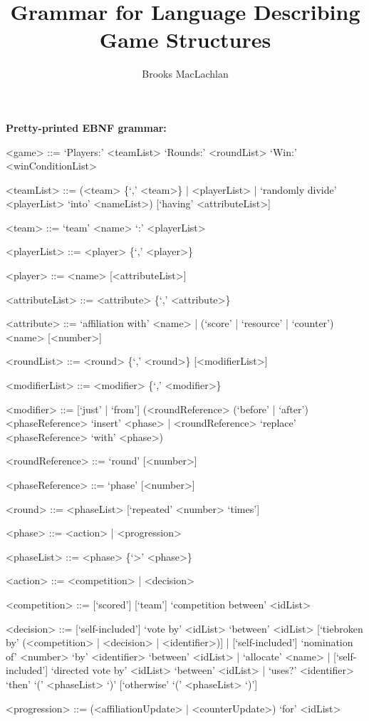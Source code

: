 \documentclass{article}
\title{Grammar for Language Describing Game Structures}
\author{Brooks MacLachlan}
\begin{document}
\maketitle

\noindent \textbf{Pretty-printed EBNF grammar:}
\begin{grammar}
<game> ::= `Players:' <teamList> `Rounds:' <roundList> `Win:' 
<winConditionList>

<teamList> ::= (<team> \{`,' <team>\} | <playerList> | `randomly divide' 
<playerList> `into' <nameList>) [`having' <attributeList>]

<team> ::= `team' <name> `:' <playerList>

<playerList> ::= <player> \{`,' <player>\}

<player> ::= <name> [<attributeList>]

<attributeList> ::= <attribute> \{`,' <attribute>\}

<attribute> ::= `affiliation with' <name> | (`score' | `resource' | `counter') 
<name> [<number>]

<roundList> ::= <round> \{`,' <round>\} [<modifierList>]

<modifierList> ::= <modifier> \{`,' <modifier>\}

<modifier> ::= [`just' | `from'] (<roundReference> (`before' | `after') 
<phaseReference> `insert' <phase> | <roundReference> `replace' <phaseReference> 
`with' <phase>)

<roundReference> ::= `round' [<number>]

<phaseReference> ::= `phase' [<number>]

<round> ::= <phaseList> [`repeated' <number> `times']

<phase> ::= <action> | <progression>

<phaseList> ::= <phase> \{`>' <phase>\}

<action> ::= <competition> | <decision>

<competition> ::= [`scored'] [`team'] `competition between' <idList>

<decision> ::= [`self-included'] `vote by' <idList> `between' <idList> 
[`tiebroken by' (<competition> | <decision> | <identifier>)] | 
[`self-included'] `nomination of' <number> `by' <identifier> `between' <idList> 
| `allocate' <name> | [`self-included'] `directed vote by' <idList> `between' 
<idList> | `uses?' <identifier> `then' `(' <phaseList> `)' [`otherwise' `(' 
<phaseList> `)']

<progression> ::= (<affiliationUpdate> | <counterUpdate>) 
`for' <idList>


\end{grammar}
\end{document}
